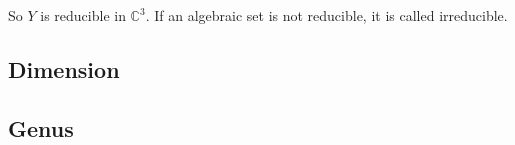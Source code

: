 So $Y$ is reducible in $\mathbb{C}^3$. If an algebraic set is not reducible, it is called irreducible. 











\subsection{Dimension}
\subsection{Genus}


